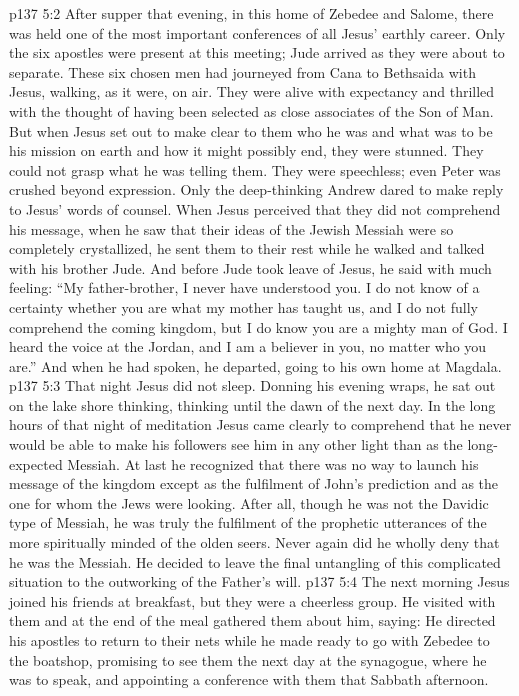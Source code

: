 \vs p137 5:2 After supper that evening, in this home of Zebedee and Salome, there was held one of the most important conferences of all Jesus’ earthly career. Only the six apostles were present at this meeting; Jude arrived as they were about to separate. These six chosen men had journeyed from Cana to Bethsaida with Jesus, walking, as it were, on air. They were alive with expectancy and thrilled with the thought of having been selected as close associates of the Son of Man. But when Jesus set out to make clear to them who he was and what was to be his mission on earth and how it might possibly end, they were stunned. They could not grasp what he was telling them. They were speechless; even Peter was crushed beyond expression. Only the deep\hyp{}thinking Andrew dared to make reply to Jesus’ words of counsel. When Jesus perceived that they did not comprehend his message, when he saw that their ideas of the Jewish Messiah were so completely crystallized, he sent them to their rest while he walked and talked with his brother Jude. And before Jude took leave of Jesus, he said with much feeling: “My father\hyp{}brother, I never have understood you. I do not know of a certainty whether you are what my mother has taught us, and I do not fully comprehend the coming kingdom, but I do know you are a mighty man of God. I heard the voice at the Jordan, and I am a believer in you, no matter who you are.” And when he had spoken, he departed, going to his own home at Magdala.
\vs p137 5:3 That night Jesus did not sleep. Donning his evening wraps, he sat out on the lake shore thinking, thinking until the dawn of the next day. In the long hours of that night of meditation Jesus came clearly to comprehend that he never would be able to make his followers see him in any other light than as the long\hyp{}expected Messiah. At last he recognized that there was no way to launch his message of the kingdom except as the fulfilment of John’s prediction and as the one for whom the Jews were looking. After all, though he was not the Davidic type of Messiah, he was truly the fulfilment of the prophetic utterances of the more spiritually minded of the olden seers. Never again did he wholly deny that he was the Messiah. He decided to leave the final untangling of this complicated situation to the outworking of the Father’s will.
\vs p137 5:4 The next morning Jesus joined his friends at breakfast, but they were a cheerless group. He visited with them and at the end of the meal gathered them about him, saying:  He directed his apostles to return to their nets while he made ready to go with Zebedee to the boatshop, promising to see them the next day at the synagogue, where he was to speak, and appointing a conference with them that Sabbath afternoon.
